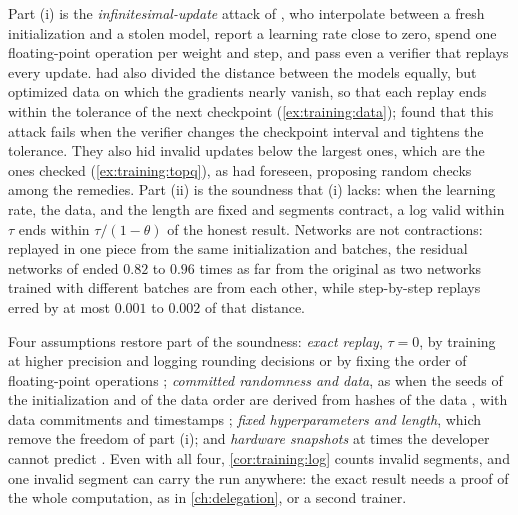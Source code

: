\begin{refsection}
Part (i) is the \emph{infinitesimal-update} attack of \textcite{FangEtAl2023}, who interpolate between a fresh initialization and a stolen model, report a learning rate close to zero, spend one floating-point operation per weight and step, and pass even a verifier that replays every update. \Textcite{ZhangEtAl2022} had also divided the distance between the models equally, but optimized data on which the gradients nearly vanish, so that each replay ends within the tolerance of the next checkpoint (\cref{ex:training:data}); \textcite{FangEtAl2023} found that this attack fails when the verifier changes the checkpoint interval and tightens the tolerance. They also hid invalid updates below the largest ones, which are the ones checked (\cref{ex:training:topq}), as \textcite{JiaEtAl2021} had foreseen, proposing random checks among the remedies. Part (ii) is the soundness that (i) lacks: when the learning rate, the data, and the length are fixed and segments contract, a log valid within $\tau$ ends within $\tau/(1-\theta)$ of the honest result. Networks are not contractions: replayed in one piece from the same initialization and batches, the residual networks of \textcite[Table~I]{JiaEtAl2021} ended $0.82$ to $0.96$ times as far from the original as two networks trained with different batches are from each other, while step-by-step replays erred by at most $0.001$ to $0.002$ of that distance.

Four assumptions restore part of the soundness: \emph{exact replay}, $\tau=0$, by training at higher precision and logging rounding decisions \parencite{SrivastavaAroraBoneh2024} or by fixing the order of floating-point operations \parencite{ArunEtAl2025}; \emph{committed randomness and data}, as when the seeds of the initialization and of the data order are derived from hashes of the data \parencite{ChoiShavitDuvenaud2023}, with data commitments and timestamps \parencite{FangEtAl2023}; \emph{fixed hyperparameters and length}, which remove the freedom of part (i); and \emph{hardware snapshots} at times the developer cannot predict \parencite{Shavit2023}. Even with all four, \cref{cor:training:log} counts invalid segments, and one invalid segment can carry the run anywhere: the exact result needs a proof of the whole computation, as in \cref{ch:delegation}, or a second trainer.


\end{refsection}
